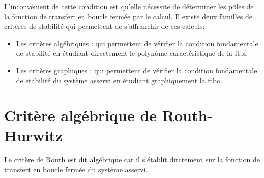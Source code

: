 L'inconvénient de cette condition est qu'elle nécessite de déterminer les
pôles de la fonction de transfert en boucle fermée par le calcul. Il existe
deux familles de critères de stabilité qui permettent de s'affranchir de 
ces calculs:
\begin{itemize}
    \item Les critères algébriques : qui permettent de vérifier la condition 
        fondamentale de stabilité en étudiant directement le polynôme 
        caractéristique de la \gls{ftbf}.
    \item Les critères graphiques : qui permettent de vérifier la condition
        fondamentale de stabilité du système asservi en étudiant graphiquement
        la \gls{ftbo}.
\end{itemize}
\newpage
{}
\captionsetup{width=0.9\linewidth}
\section{Critère algébrique de Routh-Hurwitz
}
Le critère de Routh est dit algébrique car il s'établit 
dirctement sur la fonction de transfert en boucle fermée du système asservi. 

